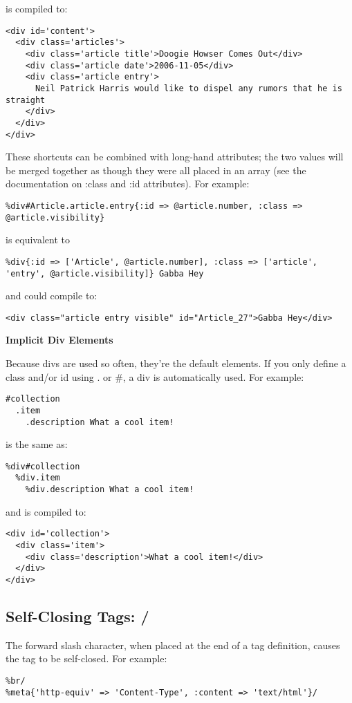 \documentclass[9pt]{article}
\begin{document}
 is compiled to:
\begin{verbatim}
<div id='content'>
  <div class='articles'>
    <div class='article title'>Doogie Howser Comes Out</div>
    <div class='article date'>2006-11-05</div>
    <div class='article entry'>
      Neil Patrick Harris would like to dispel any rumors that he is straight
    </div>
  </div>
</div>
\end{verbatim}


 These shortcuts can be combined with long-hand attributes; the two values will be merged together as though they were all placed in an array (see the documentation on :class and :id attributes). For example:
\begin{verbatim}
%div#Article.article.entry{:id => @article.number, :class => @article.visibility}
\end{verbatim}


 is equivalent to
\begin{verbatim}
%div{:id => ['Article', @article.number], :class => ['article', 'entry', @article.visibility]} Gabba Hey
\end{verbatim}


 and could compile to:
\begin{verbatim}
<div class="article entry visible" id="Article_27">Gabba Hey</div>
\end{verbatim}
\textbf{Implicit Div Elements}


 Because divs are used so often, they’re the default elements. If you only define a class and/or id using . or \#, a div is automatically used. For example:
\begin{verbatim}
#collection
  .item
    .description What a cool item!
\end{verbatim}


 is the same as:
\begin{verbatim}
%div#collection
  %div.item
    %div.description What a cool item!
\end{verbatim}


 and is compiled to:
\begin{verbatim}
<div id='collection'>
  <div class='item'>
    <div class='description'>What a cool item!</div>
  </div>
</div>
\end{verbatim}
\subsection{Self-Closing Tags: /}


 The forward slash character, when placed at the end of a tag definition, causes the tag to be self-closed. For example:
\begin{verbatim}
%br/
%meta{'http-equiv' => 'Content-Type', :content => 'text/html'}/
\end{verbatim}
\end{document}
